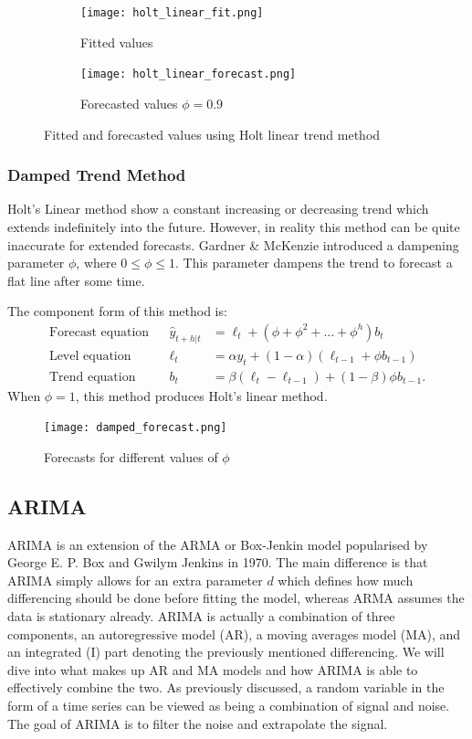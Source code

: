 \documentclass{article}
\begin{document}
  \begin{figure}[H]
    \centering
    \captionsetup{justification=centering}
    \begin{subfigure}[b]{0.49\linewidth}
      \texttt{[image: holt\_linear\_fit.png]}
      \caption{Fitted values}
    \end{subfigure}
    \begin{subfigure}[b]{0.49\linewidth}
      \texttt{[image: holt\_linear\_forecast.png]}
      \caption{Forecasted values $\phi=0.9$}
    \end{subfigure}
    \caption{Fitted and forecasted values using Holt linear trend method}
  \end{figure}

  \subsubsection*{Damped Trend Method}
  Holt's Linear method show a constant increasing or decreasing trend which extends indefinitely into the future. However, in reality this method can be quite inaccurate for extended forecasts. Gardner \& McKenzie introduced a dampening parameter $\phi$, where $0 \le \phi \le 1$. This parameter dampens the trend to forecast a flat line after some time.

  The component form of this method is:
  \begin{align*}
    \text{Forecast equation}&& \hat{y}_{t+h|t} &= \ell_{t} + (\phi+\phi^2+...+\phi^h)b_{t} \\
    \text{Level equation}   && \ell_{t} &= \alpha y_{t} + (1 - \alpha)(\ell_{t-1} + \phi b_{t-1})\\
    \text{Trend equation}   && b_{t}    &= \beta(\ell_{t} - \ell_{t-1}) + (1 -\beta)\phi b_{t-1}.
  \end{align*}
  When $\phi=1$, this method produces Holt's linear method.

  \begin{figure}[H]
    \centering
    \captionsetup{justification=centering}
    \texttt{[image: damped\_forecast.png]}
    \caption{Forecasts for different values of $\phi$}
  \end{figure}

  \subsection{ARIMA}
    ARIMA is an extension of the ARMA or Box-Jenkin model popularised by George E. P. Box and Gwilym Jenkins in 1970. The main difference is that ARIMA simply allows for an extra parameter $d$ which defines how much differencing should be done before fitting the model, whereas ARMA assumes the data is stationary already. 
    ARIMA is actually a combination of three components, an autoregressive model (AR), a moving averages model (MA), and an integrated (I) part denoting the previously mentioned differencing. We will dive into what makes up AR and MA models and how ARIMA is able to effectively combine the two.
    As previously discussed, a random variable in the form of a time series can be viewed as being a combination of signal and noise. The goal of ARIMA is to filter the noise and extrapolate the signal.
  
\end{document}
